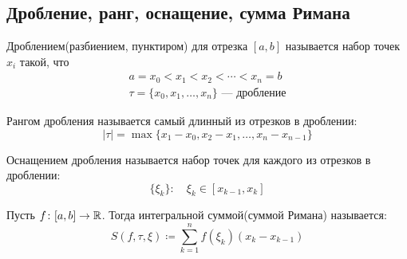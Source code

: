 \subsection{Дробление, ранг, оснащение, сумма Римана}
\begin{conj}
    Дроблением(разбиением, пунктиром) для отрезка $[a, b]$ называется набор точек $x_i$ такой, что
    \begin{equation*}
        \begin{gathered}
            a = x_0 < x_1 < x_2 < \dotsb < x_n = b\\
            \tau = \{x_0, x_1, \dotsc, x_n\}\text{ --- дробление}
        \end{gathered}
    \end{equation*}

    Рангом дробления называется самый длинный из отрезков в дроблении:
    \begin{equation*}
        |\tau| = \max\{x_1 - x_0, x_2 - x_1, \dotsc, x_n - x_{n - 1}\}
    \end{equation*}

    Оснащением дробления называется набор точек для каждого из отрезков в дроблении:
    \begin{equation*}
        \{\xi_k\}\colon \quad \xi_k \in [x_{k - 1}, x_k]
    \end{equation*}

    Пусть $f\colon [a, b] \to \mathbb{R}$. Тогда интегральной суммой(суммой Римана) называется:
    \begin{equation*}
        S(f, \tau, \xi) \coloneqq \sum\limits_{k = 1}^{n} f(\xi_k)(x_k - x_{k - 1})
    \end{equation*}
\end{conj}